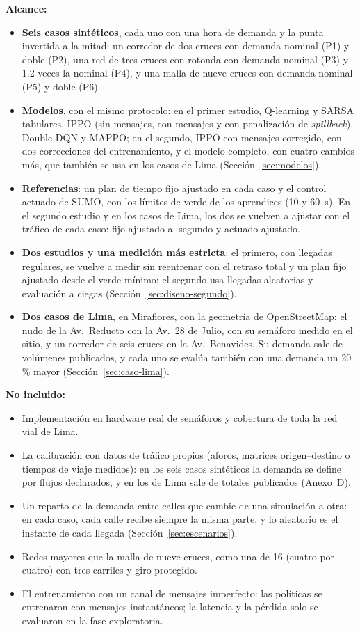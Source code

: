 
\textbf{Alcance:}
\begin{itemize}
    \item \textbf{Seis casos sintéticos}, cada uno con una hora de demanda y la punta invertida a la mitad: un corredor de dos cruces con demanda nominal (P1) y doble (P2), una red de tres cruces con rotonda con demanda nominal (P3) y 1.2 veces la nominal (P4), y una malla de nueve cruces con demanda nominal (P5) y doble (P6).
    \item \textbf{Modelos}, con el mismo protocolo: en el primer estudio, Q-learning y SARSA tabulares, IPPO (sin mensajes, con mensajes y con penalización de \textit{spillback}), Double DQN y MAPPO; en el segundo, IPPO con mensajes corregido, con dos correcciones del entrenamiento, y el modelo completo, con cuatro cambios más, que también se usa en los casos de Lima (Sección~\ref{sec:modelos}).
    \item \textbf{Referencias}: un plan de tiempo fijo ajustado en cada caso y el control actuado de SUMO, con los límites de verde de los aprendices (10 y 60~s). En el segundo estudio y en los casos de Lima, los dos se vuelven a ajustar con el tráfico de cada caso: fijo ajustado al segundo y actuado ajustado.
    \item \textbf{Dos estudios y una medición más estricta}: el primero, con llegadas regulares, se vuelve a medir sin reentrenar con el retraso total y un plan fijo ajustado desde el verde mínimo; el segundo usa llegadas aleatorias y evaluación a ciegas (Sección~\ref{sec:diseno-segundo}).
    \item \textbf{Dos casos de Lima}, en Miraflores, con la geometría de OpenStreetMap: el nudo de la Av.~Reducto con la Av.~28 de Julio, con su semáforo medido en el sitio, y un corredor de seis cruces en la Av.~Benavides. Su demanda sale de volúmenes publicados, y cada uno se evalúa también con una demanda un 20\,\% mayor (Sección~\ref{sec:caso-lima}).
\end{itemize}

\textbf{No incluido:}
\begin{itemize}
    \item Implementación en hardware real de semáforos y cobertura de toda la red vial de Lima.
    \item La calibración con datos de tráfico propios (aforos, matrices origen--destino o tiempos de viaje medidos): en los seis casos sintéticos la demanda se define por flujos declarados, y en los de Lima sale de totales publicados (Anexo~D).
    \item Un reparto de la demanda entre calles que cambie de una simulación a otra: en cada caso, cada calle recibe siempre la misma parte, y lo aleatorio es el instante de cada llegada (Sección~\ref{sec:escenarios}).
    \item Redes mayores que la malla de nueve cruces, como una de 16 (cuatro por cuatro) con tres carriles y giro protegido.
    \item El entrenamiento con un canal de mensajes imperfecto: las políticas se entrenaron con mensajes instantáneos; la latencia y la pérdida solo se evaluaron en la fase exploratoria.
\end{itemize}

